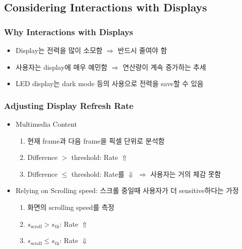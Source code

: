\subsection{Considering Interactions with Displays}

\subsubsection*{Why Interactions with Displays}
\begin{itemize}
    \item Display는 전력을 많이 소모함 $\Rightarrow$ 반드시 줄여야 함
    \item 사용자는 display에 매우 예민함 $\Rightarrow$ 연산량이 계속 증가하는 추세
    \item LED display는 dark mode 등의 사용으로 전력을 save할 수 있음
\end{itemize}

\subsubsection*{Adjusting Display Refresh Rate}
\begin{itemize}
    \item Multimedia Content
    \begin{enumerate}
        \item 현재 frame과 다음 frame을 픽셀 단위로 분석함
        \item Difference $>$ threshold: Rate $\Uparrow$
        \item Difference $\leq$ threshold: Rate를 $\Downarrow$ $\Rightarrow$ 사용자는 거의 체감 못함
    \end{enumerate}
    \item Relying on Scrolling speed: 스크롤 중일때 사용자가 더 sensitive하다는 가정
    \begin{enumerate}
        \item 화면의 scrolling speed를 측정
        \item $s_\mathrm{scroll} > s_\mathrm{th}$: Rate $\Uparrow$
        \item $s_\mathrm{scroll} \leq s_\mathrm{th}$: Rate $\Downarrow$
    \end{enumerate}
\end{itemize}

